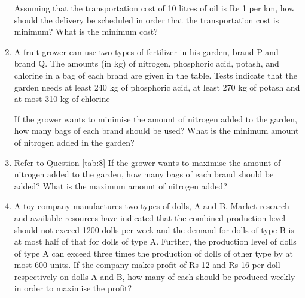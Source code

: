 \documentclass[journal,12pt,twocolumn]{IEEEtran}
\begin{document}
\begin{enumerate}
\begin{table}[h]
\centering

\caption{}
\end{table}

Assuming that the transportation cost of 10 litres of oil is Re 1 per km, how should the delivery be scheduled in order that the transportation cost is minimum? What is the minimum cost?

\item A fruit grower can use two types of fertilizer in his garden, brand P and brand Q. The amounts (in kg) of nitrogen, phosphoric acid, potash, and chlorine in a bag of each brand are given in the table. Tests indicate that the garden needs at least 240 kg of phosphoric acid, at least 270 kg of potash and at most 310 kg of chlorine

If the grower wants to minimise the amount of nitrogen added to the garden, how many bags of each brand should be used? What is the minimum amount of nitrogen added in the garden?

\begin{table}[h]
\centering

\caption{}
\label{tab:8}
\end{table}

\item Refer to Question \ref{tab:8} If the grower wants to maximise the amount of nitrogen added to the garden, how many bags of each brand should be added? What is the maximum amount of nitrogen added?

\item A toy company manufactures two types of dolls, A and B. Market research and available resources have indicated that the combined production level should not exceed 1200 dolls per week and the demand for dolls of type B is at most half of that for dolls of type A. Further, the production level of dolls of type A can exceed three times the production of dolls of other type by at most 600 units. If the company makes profit of Rs 12 and Rs 16 per doll respectively on dolls A and B, how many of each should be produced weekly in order to maximise the profit?

\end{enumerate}
\end{document}
